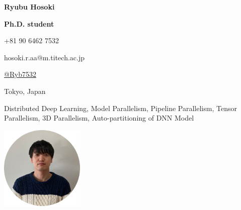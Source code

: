 \documentclass[10pt]{article}
\begin{document}
\setcounter{secnumdepth}{0}
\setlength{\parindent}{0pt}
\setlength{\baselineskip}{12pt}
\pagestyle{empty}

\begin{minipage}[h]{11cm}
  {\huge\sf\textbf{Ryubu Hosoki}\par}
  \vspace{2mm}
  {\large\sf\textbf{Ph.D. student}\par}
  \vspace{2mm}
  \begin{minipage}[t]{6cm}
    \begin{description}[align=left,leftmargin=1.5cm,style=multiline]
      \setlength{\itemsep}{0pt}
      \item [Phone] +81 90 6462 7532
      \item [Email] hosoki.r.aa@m.titech.ac.jp
    \end{description}
  \end{minipage}
  \begin{minipage}[t]{5cm}
    \begin{description}[align=left,leftmargin=1.8cm,style=multiline]
      \setlength{\itemsep}{0pt}
      \item [Github] \href{https://github.com/Ryb7532}{@Ryb7532}
      \item [Address] Tokyo, Japan
    \end{description}
  \end{minipage}
  \begin{description}[align=left,leftmargin=2cm,style=multiline]
    \setlength{\itemsep}{0pt}
    \item [Research Interests] Distributed Deep Learning, Model Parallelism, Pipeline Parallelism, Tensor Parallelism, 3D Parallelism, Auto-partitioning of DNN Model
  \end{description}
\end{minipage}
\begin{minipage}[h]{5.5cm}
  \raggedleft
  \includegraphics[width=4cm]{./images/icon.png}
\end{minipage}
\end{document}
